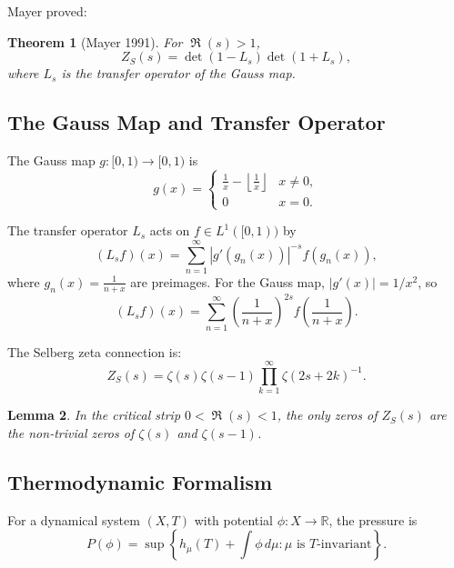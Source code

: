 \documentclass[11pt,a4paper]{article}
\newtheorem{theorem}{Theorem}[section]
\newtheorem{lemma}[theorem]{Lemma}
\theoremstyle{definition}
\DeclareMathOperator{\Ree}{\Re}
\newcommand{\R}{\mathbb{R}}
\newcommand{\Zeta}{\zeta}
\begin{document}
Mayer proved:
\begin{theorem}[Mayer 1991]
\label{thm:mayer}
For $\Ree(s) > 1$,
\begin{equation*}
Z_S(s) = \det(1 - L_s) \det(1 + L_s),
\end{equation*}
where $L_s$ is the transfer operator of the Gauss map.
\end{theorem}

\subsection{The Gauss Map and Transfer Operator}
\label{sec:gauss-map}

The Gauss map $g: [0,1) \to [0,1)$ is
\begin{equation*}
g(x) = \begin{cases}\frac{1}{x} - \left\lfloor \frac{1}{x} \right\rfloor & x \neq 0, \\ 0 & x = 0.\end{cases}
\end{equation*}

The transfer operator $L_s$ acts on $f \in L^1([0,1))$ by
\begin{equation*}
(L_s f)(x) = \sum_{n=1}^{\infty} |g'(g_n(x))|^{-s} f(g_n(x)),
\end{equation*}
where $g_n(x) = \frac{1}{n + x}$ are preimages. For the Gauss map, $|g'(x)| = 1/x^2$, so
\begin{equation}
\label{eq:transfer-operator}
(L_s f)(x) = \sum_{n=1}^{\infty} \left(\frac{1}{n + x}\right)^{2s} f\left(\frac{1}{n + x}\right).
\end{equation}

The Selberg zeta connection is:
\begin{equation}
\label{eq:selberg-zeta}
Z_S(s) = \Zeta(s) \Zeta(s-1) \prod_{k=1}^{\infty} \Zeta(2s + 2k)^{-1}.
\end{equation}

\begin{lemma}
\label{lem:selberg-zeros}
In the critical strip $0 < \Ree(s) < 1$, the only zeros of $Z_S(s)$ are the non-trivial zeros of $\Zeta(s)$ and $\Zeta(s-1)$.
\end{lemma}

\subsection{Thermodynamic Formalism}
\label{sec:thermodynamic}

For a dynamical system $(X, T)$ with potential $\phi: X \to \R$, the pressure is
\begin{equation*}
P(\phi) = \sup \left\{ h_\mu(T) + \int \phi \, d\mu : \mu \text{ is } T\text{-invariant} \right\}.
\end{equation*}
\end{document}
